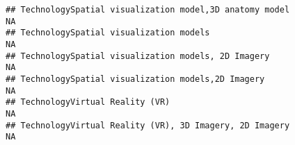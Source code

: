 \documentclass[]{article}
\begin{document}
\begin{verbatim}
## TechnologySpatial visualization model,3D anatomy model                                                                                                                                                                                                                                                                                                                                                                                                                                NA
## TechnologySpatial visualization models                                                                                                                                                                                                                                                                                                                                                                                                                                                NA
## TechnologySpatial visualization models, 2D Imagery                                                                                                                                                                                                                                                                                                                                                                                                                                    NA
## TechnologySpatial visualization models,2D Imagery                                                                                                                                                                                                                                                                                                                                                                                                                                     NA
## TechnologyVirtual Reality (VR)                                                                                                                                                                                                                                                                                                                                                                                                                                                        NA
## TechnologyVirtual Reality (VR), 3D Imagery, 2D Imagery                                                                                                                                                                                                                                                                                                                                                                                                                                NA

\end{verbatim}
\end{document}
